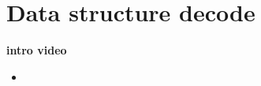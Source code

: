 \documentclass[english]{article}
\begin{document}
\tableofcontents

\newpage

\section{Data structure decode}
\textbf{intro video}
\begin{itemize}
  \item 
\end{itemize}




































\newpage





\appendix
\end{document}
